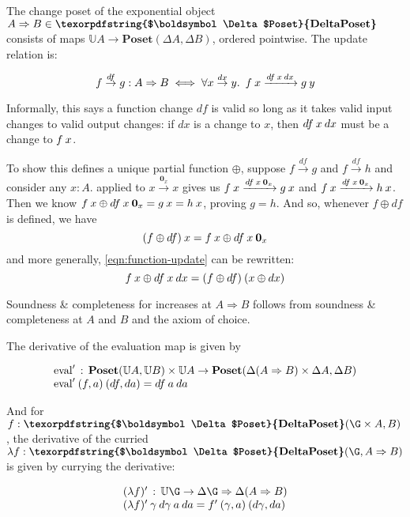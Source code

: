 \documentclass{rntz}\usepackage[a5]{rntzgeometry}\usepackage[fullwidth=130mm,width=330pt,]{narrow}
\newcommand\mathvar[1]{\ensuremath{#1}} %
\newcommand\cat\textbf
\newcommand\CP{\cat{\texorpdfstring{$\boldsymbol\Delta$Poset}{DeltaPoset}}}
\newcommand\Poset{\cat{Poset}}
\newcommand\expO[2]{#1 \Rightarrow #2}
\newcommand\D\Delta
\newcommand\x\times
\newcommand\fn\lambda
\newcommand\zero{\ensuremath{\mathbold{0}}}
\newcommand\<{\mskip 4mu plus 4mu minus 1mu}
\newcommand\da{\mathvar{da}}
\newcommand\dx{\mathvar{dx}}
\newcommand\df{\mathvar{df}}
\newcommand\fname\text
\newcommand\valfn{\ensuremath{\mathbb{U}}}
\newcommand\vals{\valfn}
\newcommand\chgs[1]{\D{#1}}
\newcommand\deriv[1]{\ensuremath{#1'}}
\newcommand\upd{\mathbin{\oplus}}
\newcommand\updfn{\ensuremath{{\upd}}}
\newcommand\quantifierspace{~\,}
\newcommand\fa[1]{\forall #1.\quantifierspace}
\newcommand\validarrow\to
\newcommand\valid[1]{\mathrel{\overset{#1}{\validarrow}}}
\newcommand\longvalid[1]{\mathrel{\xrightarrow{#1}}}
\newcommand\vld[3]{{#2 \valid{#1} #3}}
\newcommand\longvld[3]{{#2 \longvalid{#1} #3}}
\begin{document}
The change poset of the exponential object $\expO A B \in \CP$ consists of maps
$\vals A \to \Poset(\chgs A, \chgs B)$, ordered pointwise. The update relation
is:

\begin{equation}\label{eqn:function-update}
  f \valid\df g : \expO A B
  \iff \fa{x \valid\dx y} f\<x \longvalid{\df\<x\<\dx} g\<y
\end{equation}

\noindent Informally, this says a function change $\df$ is valid so long as it
takes valid input changes to valid output changes: if $\dx$ is a change to $x$,
then $\df\<x\<\dx$ must be a change to $f\<x$.

To show this defines a unique partial function \updfn, suppose $\vld\df f g$ and
$\vld\df f h$ and consider any $x : A$.  applied to
$\vld{\zero_x} x x$ gives us $\longvld{\df\<x\<\zero_x}{f\<x}{g\<x}$ and
$\longvld{\df\<x\<\zero_x}{f\<x}{h\<x}$. Then we know \(f\<x \upd
\df\<x\<\zero_x = g\<x = h\<x \), proving $g = h$. And so, whenever $f \upd \df$
is defined, we have
%
\[ (f \upd \df)\<x = f\<x \upd \df\<x\<\zero_x \]
%
and more generally, \cref{eqn:function-update} can be rewritten:
%
\begin{equation*}
  f\<x \upd \df\<x\<\dx = (f \upd \df)\<(x \upd \dx)
\end{equation*}

\noindent
Soundness \& completeness for increases at $\expO A B$ follows from soundness \&
completeness at $A$ and $B$ and the axiom of choice. %

The derivative of the evaluation map is given by

\[\begin{array}{l}
  \deriv{\fname{eval}} \,:\,
  \Poset(\vals A, \vals B)
  \x \vals A \to
  \Poset({\chgs{(\expO A B)} \x \chgs A},{\chgs B})
  \\
  \deriv{\fname{eval}} \<(f,a) \<(\df,\da) = \df\<a\<\da
\end{array}\]

\noindent
And for $f : \CP(\G \x A, B)$, the derivative of the curried $\fn f : \CP(\G,
\expO A B)$ is given by currying the derivative:

\[
\begin{array}{l}
  \deriv{(\fn f)} \,:\, \vals\G \to \expO{\chgs \G}{\chgs{(\expO A B)}}\\
  \deriv{(\fn f)} \<\gamma \<\mathvar{d\gamma} \<a \<\da
  = \deriv f \<(\gamma,a) \<(\mathvar{d\gamma}, \da)
\end{array}
\]
\end{document}

